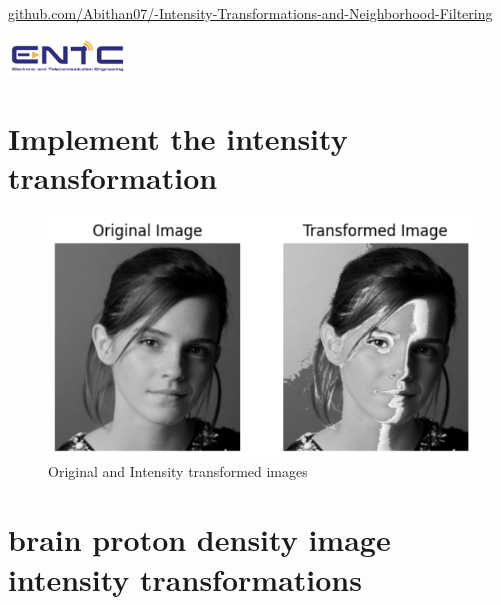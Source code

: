 \documentclass[12pt,a4paper]{article}
\makeatletter
\def\@submitdate{\number\the\day\space\space
  \ifcase\the\month\or
  January\or February\or March\or April\or May\or June\or
  July\or August\or September\or October\or November\or December\fi
  \space \number\the\year}
\makeatother
\begin{document}
\begin{titlepage}
     \centering
    \href{https://github.com/Abithan07/-Intensity-Transformations-and-Neighborhood-Filtering/tree/main}{\normalsize{github.com/Abithan07/-Intensity-Transformations-and-Neighborhood-Filtering}}
    
    \vspace{8mm}
    \includegraphics[height=10mm]{ent.png}
\end{titlepage}


\section{Implement the intensity transformation}

    \begin{figure}[H]
        \centering
        \includegraphics[width=0.5\linewidth]{images/Screenshots/1.png}
        \caption{Original and Intensity transformed images}
        \label{fig:enter-label}
    \end{figure}

    
    

\section{ brain proton density image intensity transformations}
\end{document}
